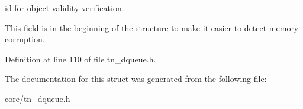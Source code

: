 id for object validity verification. 

This field is in the beginning of the structure to make it easier to detect memory corruption. 

Definition at line 110 of file tn\+\_\+dqueue.\+h.



The documentation for this struct was generated from the following file\+:\begin{DoxyCompactItemize}
\item 
core/\hyperlink{tn__dqueue_8h}{tn\+\_\+dqueue.\+h}\end{DoxyCompactItemize}
